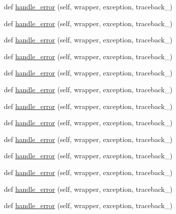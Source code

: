 \begin{DoxyCompactItemize}
\item 
def \hyperlink{classmodulegen____gcc__ILP32_1_1ErrorHandler_a943006387a8560b17fc047599f8e3097}{handle\+\_\+error} (self, wrapper, exception, traceback\+\_\+)
\item 
def \hyperlink{classmodulegen____gcc__ILP32_1_1ErrorHandler_a943006387a8560b17fc047599f8e3097}{handle\+\_\+error} (self, wrapper, exception, traceback\+\_\+)
\item 
def \hyperlink{classmodulegen____gcc__ILP32_1_1ErrorHandler_a943006387a8560b17fc047599f8e3097}{handle\+\_\+error} (self, wrapper, exception, traceback\+\_\+)
\item 
def \hyperlink{classmodulegen____gcc__ILP32_1_1ErrorHandler_a943006387a8560b17fc047599f8e3097}{handle\+\_\+error} (self, wrapper, exception, traceback\+\_\+)
\item 
def \hyperlink{classmodulegen____gcc__ILP32_1_1ErrorHandler_a943006387a8560b17fc047599f8e3097}{handle\+\_\+error} (self, wrapper, exception, traceback\+\_\+)
\item 
def \hyperlink{classmodulegen____gcc__ILP32_1_1ErrorHandler_a943006387a8560b17fc047599f8e3097}{handle\+\_\+error} (self, wrapper, exception, traceback\+\_\+)
\item 
def \hyperlink{classmodulegen____gcc__ILP32_1_1ErrorHandler_a943006387a8560b17fc047599f8e3097}{handle\+\_\+error} (self, wrapper, exception, traceback\+\_\+)
\item 
def \hyperlink{classmodulegen____gcc__ILP32_1_1ErrorHandler_a943006387a8560b17fc047599f8e3097}{handle\+\_\+error} (self, wrapper, exception, traceback\+\_\+)
\item 
def \hyperlink{classmodulegen____gcc__ILP32_1_1ErrorHandler_a943006387a8560b17fc047599f8e3097}{handle\+\_\+error} (self, wrapper, exception, traceback\+\_\+)
\item 
def \hyperlink{classmodulegen____gcc__ILP32_1_1ErrorHandler_a943006387a8560b17fc047599f8e3097}{handle\+\_\+error} (self, wrapper, exception, traceback\+\_\+)
\item 
def \hyperlink{classmodulegen____gcc__ILP32_1_1ErrorHandler_a943006387a8560b17fc047599f8e3097}{handle\+\_\+error} (self, wrapper, exception, traceback\+\_\+)
\item 
def \hyperlink{classmodulegen____gcc__ILP32_1_1ErrorHandler_a943006387a8560b17fc047599f8e3097}{handle\+\_\+error} (self, wrapper, exception, traceback\+\_\+)
\item 
def \hyperlink{classmodulegen____gcc__ILP32_1_1ErrorHandler_a943006387a8560b17fc047599f8e3097}{handle\+\_\+error} (self, wrapper, exception, traceback\+\_\+)

\end{DoxyCompactItemize}
